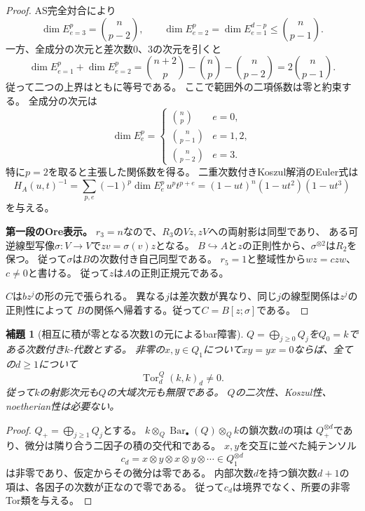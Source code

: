 \documentclass[11pt,a4paper]{ltjsarticle}
\newtheorem{lemma}[theorem]{補題}
\theoremstyle{definition}
\begin{document}
\begin{proof}
AS完全対合により
\[
\dim E^p_{e=3}=\binom n{p-2},\qquad
\dim E^p_{e=2}=\dim E^{d-p}_{e=1}\leq\binom n{p-1}.
\]
一方、全成分の次元と差次数0、3の次元を引くと
\[
\dim E^p_{e=1}+\dim E^p_{e=2}
=\binom{n+2}p-\binom np-\binom n{p-2}
=2\binom n{p-1}.
\]
従って二つの上界はともに等号である。
ここで範囲外の二項係数は零と約束する。
全成分の次元は
\[
\dim E^p_e=
\begin{cases}
\binom np&e=0,\\
\binom n{p-1}&e=1,2,\\
\binom n{p-2}&e=3.
\end{cases}
\]
特に$p=2$を取ると主張した関係数を得る。
二重次数付きKoszul解消のEuler式は
\[
H_A(u,t)^{-1}
=\sum_{p,e}(-1)^p\dim E^p_e\,u^pt^{p+e}
=(1-ut)^n(1-ut^2)(1-ut^3)
\]
を与える。

\par\smallskip\noindent\textbf{第一段のOre表示。}\quad
$r_3=n$なので、$R_3$の$Vz,zV$への両射影は同型であり、
ある可逆線型写像$\sigma:V\to V$で$zv=\sigma(v)z$となる。
$B\hookrightarrow A$と$z$の正則性から、$\sigma^{\otimes2}$は$R_2$を保つ。
従って$\sigma$は$B$の次数付き自己同型である。
$r_5=1$と整域性から$wz=c zw$、$c\ne0$と書ける。
従って$z$は$A$の正則正規元である。

$C$は$bz^j$の形の元で張られる。
異なる$j$は差次数が異なり、同じ$j$の線型関係は$z^j$の正則性によって
$B$の関係へ帰着する。従って$C=B[z;\sigma]$である。
\end{proof}


\begin{lemma}[相互に積が零となる次数1の元によるbar障害]
\label{bar:lem:two-cycle}
$Q=\bigoplus_{j\ge0}Q_j$を$Q_0=k$である次数付き$k$-代数とする。
非零の$x,y\in Q_1$について$xy=yx=0$ならば、全ての$d\ge1$について
\[
\operatorname{Tor}^Q_d(k,k)_d\ne0.
\]
従って$k$の射影次元も$Q$の大域次元も無限である。
$Q$の二次性、Koszul性、noetherian性は必要ない。
\end{lemma}
\begin{proof}
$Q_+=\bigoplus_{j\ge1}Q_j$とする。
$k\otimes_Q\operatorname{Bar}_\bullet(Q)\otimes_Q k$の鎖次数$d$の項は
$Q_+^{\otimes d}$であり、微分は隣り合う二因子の積の交代和である。
$x,y$を交互に並べた純テンソル
\[
c_d=x\otimes y\otimes x\otimes y\otimes\cdots
\in Q_1^{\otimes d}
\]
は非零であり、仮定からその微分は零である。
内部次数$d$を持つ鎖次数$d+1$の項は、各因子の次数が正なので零である。
従って$c_d$は境界でなく、所要の非零Tor類を与える。
\end{proof}
\end{document}
